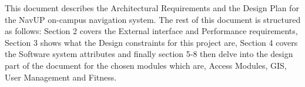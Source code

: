 This document describes the Architectural Requirements and the Design Plan for the NavUP on-campus navigation system. The rest of this document is structured as follows: Section 2 covers the External interface and Performance requirements, Section 3 shows what the Design constraints for this project are, Section 4 covers the Software system attributes and finally section 5-8 then delve into the design part of the document for the chosen modules which are, Access Modules, GIS, User Management and Fitness.
